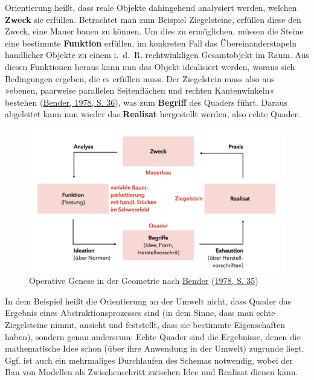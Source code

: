 \documentclass[
  ngerman,
]{scrbook}
\theoremstyle{definition}
\theoremstyle{definition}
\theoremstyle{definition}
\theoremstyle{definition}
\theoremstyle{remark}
\begin{document}
Orientierung heißt, dass reale Objekte dahingehend analysiert werden, welchen \textbf{Zweck} sie erfüllen. Betrachtet man zum Beispiel Ziegelsteine, erfüllen diese den Zweck, eine Mauer bauen zu können. Um dies zu ermöglichen, müssen die Steine eine bestimmte \textbf{Funktion} erfüllen, im konkreten Fall das Übereinanderstapeln handlicher Objekte zu einem i.~d.~R. rechtwinkligen Gesamtobjekt im Raum. Aus diesen Funktionen heraus kann nun das Objekt idealisiert werden, woraus sich Bedingungen ergeben, die es erfüllen muss. Der Ziegelstein muss also aus »ebenen, paarweise parallelen Seitenflächen und rechten Kantenwinkeln« bestehen (\protect\hyperlink{ref-Bender1978}{Bender, 1978, S. 36}), was zum \textbf{Begriff} des Quaders führt. Daraus abgeleitet kann nun wieder das \textbf{Realisat} hergestellt werden, also echte Quader.



\begin{figure}

{\centering \includegraphics[width=1\linewidth]{pictures/6-operativ} 

}

\caption{Operative Genese in der Geometrie nach \protect\hyperlink{ref-Bender1978}{Bender} (\protect\hyperlink{ref-Bender1978}{1978, S. 35})}\label{fig:OperativeGenese}
\end{figure}

In dem Beispiel heißt die Orientierung an der Umwelt nicht, dass Quader das Ergebnis eines Abstraktionsprozesses sind (in dem Sinne, dass man echte Ziegelsteine nimmt, ansieht und feststellt, dass sie bestimmte Eigenschaften haben), sondern genau andersrum: Echte Quader sind die Ergebnisse, denen die mathematische Idee schon (über ihre Anwendung in der Umwelt) zugrunde liegt. Ggf. ist auch ein mehrmaliges Durchlaufen des Schemas notwendig, wobei der Bau von Modellen als Zwischenschritt zwischen Idee und Realisat dienen kann.
\end{document}
